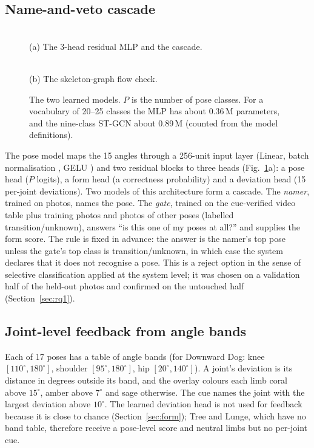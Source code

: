 \subsection{Name-and-veto cascade}\label{sec:cascade}
\begin{figure}[t]
\centering
\begin{minipage}[b]{0.50\textwidth}\centering
\resizebox{\linewidth}{!}{}\\[2pt]
{\footnotesize (a) The 3-head residual MLP and the cascade.}
\end{minipage}\hfill
\begin{minipage}[b]{0.47\textwidth}\centering
\resizebox{\linewidth}{!}{}\\[2pt]
{\footnotesize (b) The skeleton-graph flow check.}
\end{minipage}
\caption{The two learned models. $P$ is the number of pose classes. For a vocabulary of 20--25 classes the MLP has about 0.36\,M parameters, and the nine-class ST-GCN about 0.89\,M (counted from the model definitions).}
\label{fig:models}
\end{figure}
The pose model maps the 15 angles through a 256-unit input layer (Linear, batch normalisation \cite{ioffe2015bn}, GELU \cite{hendrycks2016gelu}) and two residual blocks \cite{he2016resnet} to three heads (Fig.~\ref{fig:models}a): a pose head ($P$ logits), a form head (a correctness probability) and a deviation head (15 per-joint deviations). Two models of this architecture form a cascade. The \emph{namer}, trained on photos, names the pose. The \emph{gate}, trained on the cue-verified video table plus training photos and photos of other poses (labelled transition/unknown), answers ``is this one of my poses at all?'' and supplies the form score. The rule is fixed in advance: the answer is the namer's top pose unless the gate's top class is transition/unknown, in which case the system declares that it does not recognise a pose. This is a reject option in the sense of selective classification \cite{geifman2017selective} applied at the system level; it was chosen on a validation half of the held-out photos and confirmed on the untouched half (Section~\ref{sec:rq1}).

\subsection{Joint-level feedback from angle bands}\label{sec:bands}
Each of 17 poses has a table of angle bands (for Downward Dog: knee $[110^\circ,180^\circ]$, shoulder $[95^\circ,180^\circ]$, hip $[20^\circ,140^\circ]$). A joint's deviation is its distance in degrees outside its band, and the overlay colours each limb coral above $15^\circ$, amber above $7^\circ$ and sage otherwise. The cue names the joint with the largest deviation above $10^\circ$. The learned deviation head is not used for feedback because it is close to chance (Section~\ref{sec:form}); Tree and Lunge, which have no band table, therefore receive a pose-level score and neutral limbs but no per-joint cue.

